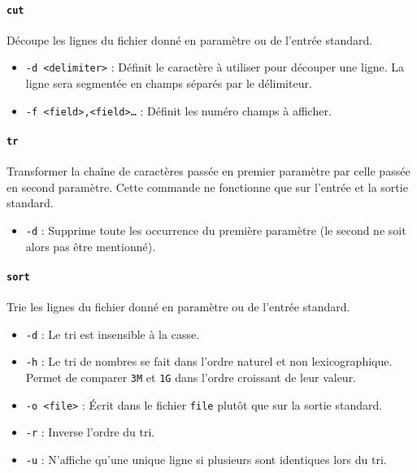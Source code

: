 \paragraph{\texttt{cut}} 
Découpe les lignes du fichier donné en paramètre ou de l'entrée standard. 
\begin{itemize}
    \item \texttt{-d <delimiter>} : Définit le caractère à utiliser pour découper une ligne. La ligne sera segmentée en champs séparés par le délimiteur.
    \item \texttt{-f <field>,<field>\dots} : Définit les numéro champs à afficher. 
\end{itemize}

\paragraph{\texttt{tr}} 
Transformer la chaîne de caractères passée en premier paramètre par celle passée en second paramètre. Cette commande ne fonctionne que sur l'entrée et la sortie standard.
\begin{itemize}
    \item \texttt{-d} : Supprime toute les occurrence du première paramètre (le second ne soit alors pas être mentionné).
\end{itemize}

\paragraph{\texttt{sort}} 
Trie les lignes du fichier donné en paramètre ou de l'entrée standard.
\begin{itemize}
    \item \texttt{-d} : Le tri est insensible à la casse.
    \item \texttt{-h} : Le tri de nombres se fait dans l'ordre naturel et non lexicographique. Permet de comparer \texttt{3M} et \texttt{1G} dans l'ordre croissant de leur valeur.
    \item \texttt{-o <file>} : Écrit dans le fichier \texttt{file} plutôt que sur la sortie standard.
    \item \texttt{-r} : Inverse l'ordre du tri.
    \item \texttt{-u} : N'affiche qu'une unique ligne si plusieurs sont identiques lors du tri.
\end{itemize}

